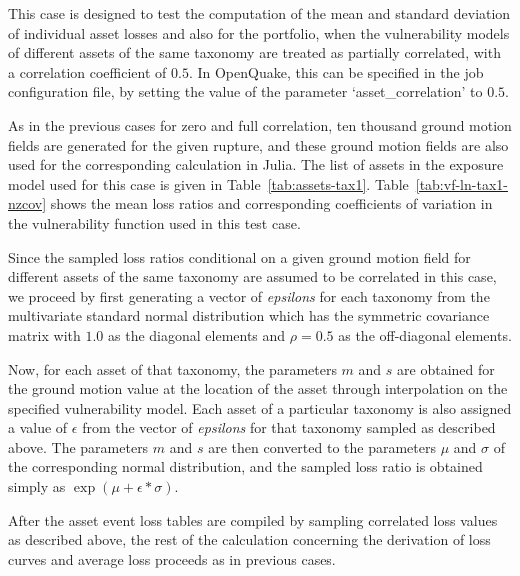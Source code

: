 This case is designed to test the computation of the mean and standard deviation of individual asset losses and also for the portfolio, when the vulnerability models of different assets of the same taxonomy are treated as partially correlated, with a correlation coefficient of $0.5$. In OpenQuake, this can be specified in the job configuration file, by setting the value of the parameter `asset\_correlation' to $0.5$.

As in the previous cases for zero and full correlation, ten thousand ground motion fields are generated for the given rupture, and these ground motion fields are also used for the corresponding calculation in Julia. The list of assets in the exposure model used for this case is given in Table~\ref{tab:assets-tax1}. Table~\ref{tab:vf-ln-tax1-nzcov} shows the mean loss ratios and corresponding coefficients of variation in the vulnerability function used in this test case.

Since the sampled loss ratios conditional on a given ground motion field for different assets of the same taxonomy are assumed to be  correlated in this case, we proceed by first generating a vector of \emph{epsilons} for each taxonomy from the multivariate standard normal distribution which has the symmetric covariance matrix with $1.0$ as the diagonal elements and $\rho = 0.5$ as the off-diagonal elements.

Now, for each asset of that taxonomy, the parameters $m$ and $s$ are obtained for the ground motion value at the location of the asset through interpolation on the specified vulnerability model. Each asset of a particular taxonomy is also assigned a value of $\epsilon$ from the vector of \emph{epsilons} for that taxonomy sampled as described above. The parameters $m$ and $s$ are then converted to the parameters $\mu$ and $\sigma$ of the corresponding normal distribution, and the sampled loss ratio is obtained simply as $\exp (\mu + \epsilon * \sigma)$.

After the asset event loss tables are compiled by sampling correlated loss values as described above, the rest of the calculation concerning the derivation of loss curves and average loss proceeds as in previous cases.